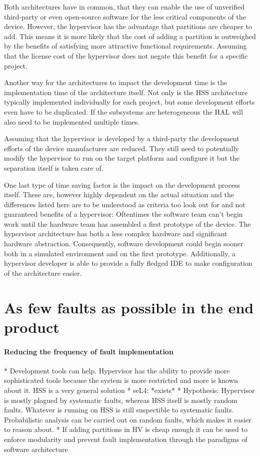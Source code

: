 Both architectures have in common, that they can enable the use of unverified third-party or even open-source software for the less critical  components of the device. However, the hypervisor has the advantage that partitions are cheaper to add. This means it is more likely that the cost of adding a partition is outweighed by the benefits of satisfying more attractive functional requirements. Assuming that the license cost of the hypervisor does not negate this benefit for a specific project.

Another way for the architectures to impact the development time is the implementation time of the architecture itself. Not only is the \gls{HSS} architecture typically implemented individually for each project, but some development efforts even have to be duplicated. If the subsystems are heterogeneous the \gls{HAL} will also need to be implemented multiple times. 

Assuming that the hypervisor is developed by a third-party the development efforts of the device manufacturer are reduced. They still need to potentially modify the hypervisor to run on the target platform and configure it but the separation itself is taken care of.

One last type of time saving factor is the impact on the development process itself. These are, however highly dependent on the actual situation and the differences listed here are to be understood as criteria too look out for and not guaranteed benefits of a hypervisor: Oftentimes the software team can't begin work until the hardware team has assembled a first prototype of the device. The hypervisor architecture has both a less complex hardware and significant hardware abstraction. Consequently, software development could begin sooner both in a simulated environment and on the first prototype. Additionally, a hypervisor developer is able to provide a fully fledged \gls{IDE} to make configuration of the architecture easier.


\section{As few faults as possible in the end product}
\paragraph{Reducing the frequency of fault implementation}
* Development tools can help. Hypervisor has the ability to provide more sophisticated tools because the system is more restricted and more is known about it. HSS is a very general solution
* seL4: *exists*
* Hypothesis: Hypervisor is mostly plagued by systematic faults, whereas HSS itself is mostly random faults. Whatever is running on HSS is still suspectible to systematic faults. Probabilistic analysis can be carried out on random faults, which makes it easier to reason about.
* If adding partitions in HV is cheap enough it can be used to enforce modularity and prevent fault implementation through the paradigms of software architecture
